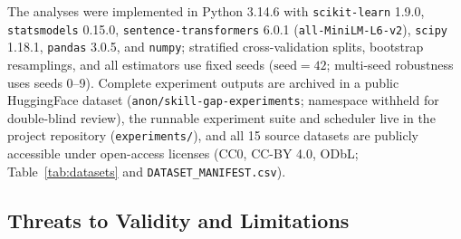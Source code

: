 \documentclass[journal]{IEEEtran}
\begin{document}
The analyses were implemented in Python 3.14.6 with \texttt{scikit-learn} 1.9.0, \texttt{statsmodels} 0.15.0, \texttt{sentence-transformers} 6.0.1 (\texttt{all-MiniLM-L6-v2}), \texttt{scipy} 1.18.1, \texttt{pandas} 3.0.5, and \texttt{numpy}; stratified cross-validation splits, bootstrap resamplings, and all estimators use fixed seeds ($\text{seed} = 42$; multi-seed robustness uses seeds 0--9). Complete experiment outputs are archived in a public HuggingFace dataset (\texttt{anon/skill-gap-experiments}; namespace withheld for double-blind review), the runnable experiment suite and scheduler live in the project repository (\texttt{experiments/}), and all 15 source datasets are publicly accessible under open-access licenses (CC0, CC-BY 4.0, ODbL; Table~\ref{tab:datasets} and \texttt{DATASET\_MANIFEST.csv}).

\subsection{Threats to Validity and Limitations}
\label{sec:limitations}
\end{document}
